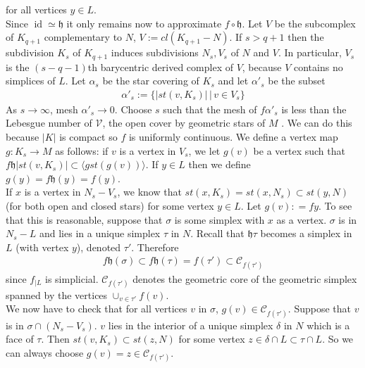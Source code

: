 \documentclass[a4paper,11pt]{article}
\theoremstyle{definition}
\theoremstyle{plain}
\theoremstyle{remark}
\DeclareMathOperator{\id}{id}
\begin{document}
{for all vertices $y\in L$.\\

Since $\id \simeq \mathfrak{h}$ it only remains now to approximate $f\circ \mathfrak{h}$. Let $V$ be the subcomplex of $K_{q+1}$ complementary to $N$, $V:=cl(K_{q+1}-N)$. If $s>q+1$ then the subdivision $K_s$ of $K_{q+1}$ induces subdivisions $N_s, V_s$ of $N$ and $V$. In particular, $V_s$ is the $(s-q-1)$th barycentric derived complex of $V$, because $V$ contains no simplices of $L$.  Let $\alpha_s$ be the star covering of $K_s$ and let $\alpha'_s$ be the subset
\begin{align*}
\alpha'_s:= \{|st(v,K_s)| \,|\, v\in V_s\}
\end{align*}
As $s\rightarrow \infty$, mesh $\alpha'_s\rightarrow 0$. Choose $s$ such that the mesh of $f\alpha'_s$ is less than the Lebesgue number of $\mathcal{V}$, the open cover by geometric stars of $M$ . We can do this because $|K|$ is compact so $f$ is uniformly continuous. We define a vertex map $g: K_{s}\rightarrow M$ as follows: if $v$ is a vertex in $V_{s}$, we let $g(v)$ be a vertex such that $f\mathfrak{h}|st(v,K_{s})| \subset \langle gst(g(v))\rangle$. If $y\in L$ then we define $g(y) = f\mathfrak{h}(y)= f(y)$. \\

If $x$ is a vertex in $N_s - V_s$, we know that  $ st(x,K_s)  =  st(x,N_s)  \subset  st(y,N) $ (for both open and closed stars) for some vertex $y\in L$. Let $g(v): = fy$. To see that this is reasonable, suppose that $\sigma$ is some simplex with $x$ as a vertex. $\sigma$ is in $N_{s}-L$ and lies in a unique simplex $\tau$ in $N$. Recall that $\mathfrak{h} \tau$ becomes a simplex in $L$ (with vertex $y$), denoted $ \tau' $. Therefore
\begin{align*}
f\mathfrak{h}  (\sigma)  \subset f\mathfrak{h}(\tau) = f (\tau') \subset \mathscr{C}_{f(\tau')}  
\end{align*}
since $f_{|L}$ is simplicial. $\mathscr{C}_{f(\tau')}$ denotes the geometric core of the geometric simplex spanned by the vertices $\cup_{v \in \tau'} f(v)$. \\

We now have to check that for all vertices $v$ in $\sigma$, $g(v) \in \mathscr{C}_{f(\tau')}$. Suppose that $v$ is in $\sigma \cap (N_s - V_s)$. $v$ lies in the interior of a unique simplex $\delta$ in $N$ which is a face of $\tau$. Then $st(v,K_{s}) \subset st(z,N)$ for some vertex $z\in \delta \cap L \subset  \tau \cap L $. So we can always choose $g(v) = z \in \mathscr{C}_{f(\tau')}$.\\

}
\end{document}
